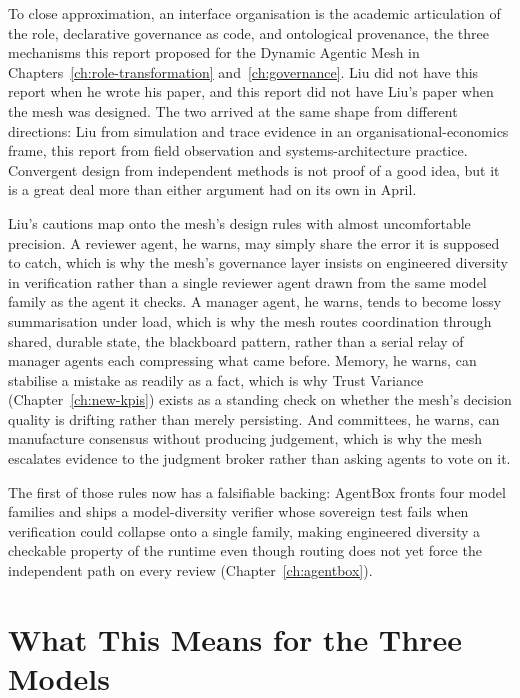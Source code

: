 \begin{keyinsight}[title={An Independent Convergence}]
To close approximation, an interface organisation is the academic articulation of the  role, declarative governance as code, and ontological provenance, the three mechanisms this report proposed for the Dynamic Agentic Mesh in Chapters~\ref{ch:role-transformation} and~\ref{ch:governance}. Liu did not have this report when he wrote his paper, and this report did not have Liu's paper when the mesh was designed. The two arrived at the same shape from different directions: Liu from simulation and trace evidence in an organisational-economics frame, this report from field observation and systems-architecture practice. Convergent design from independent methods is not proof of a good idea, but it is a great deal more than either argument had on its own in April.
\end{keyinsight}

Liu's cautions map onto the mesh's design rules with almost uncomfortable precision. A reviewer agent, he warns, may simply share the error it is supposed to catch, which is why the mesh's governance layer insists on engineered diversity in verification rather than a single reviewer agent drawn from the same model family as the agent it checks. A manager agent, he warns, tends to become lossy summarisation under load, which is why the mesh routes coordination through shared, durable state, the blackboard pattern, rather than a serial relay of manager agents each compressing what came before. Memory, he warns, can stabilise a mistake as readily as a fact, which is why Trust Variance (Chapter~\ref{ch:new-kpis}) exists as a standing check on whether the mesh's decision quality is drifting rather than merely persisting. And committees, he warns, can manufacture consensus without producing judgement, which is why the mesh escalates evidence to the judgment broker rather than asking agents to vote on it.

The first of those rules now has a falsifiable backing: AgentBox fronts four model families and ships a model-diversity verifier whose sovereign test fails when verification could collapse onto a single family, making engineered diversity a checkable property of the runtime even though routing does not yet force the independent path on every review (Chapter~\ref{ch:agentbox}).

\section{What This Means for the Three Models}

